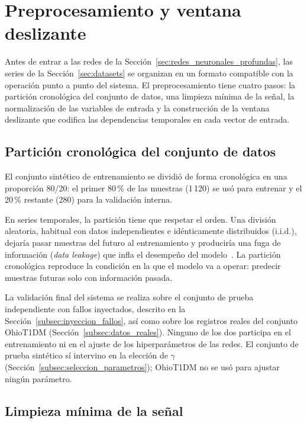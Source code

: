 \documentclass{report}
\begin{document}
\section{Preprocesamiento y ventana deslizante}
\label{sec:preprocesamiento}

Antes de entrar a las redes de la Sección~\ref{sec:redes_neuronales_profundas}, las series de la Sección~\ref{sec:datasets} se organizan en un formato compatible con la operación punto a punto del sistema. El preprocesamiento tiene cuatro pasos: la partición cronológica del conjunto de datos, una limpieza mínima de la señal, la normalización de las variables de entrada y la construcción de la ventana deslizante que codifica las dependencias temporales en cada vector de entrada.

\subsection{Partición cronológica del conjunto de datos}
\label{subsec:particion_datos}

El conjunto sintético de entrenamiento se dividió de forma cronológica en una proporción 80/20: el primer 80\,\% de las muestras (1\,120) se usó para entrenar y el 20\,\% restante (280) para la validación interna.

En series temporales, la partición tiene que respetar el orden. Una división aleatoria, habitual con datos independientes e idénticamente distribuidos (i.i.d.), dejaría pasar muestras del futuro al entrenamiento y produciría una fuga de información (\textit{data leakage}) que infla el desempeño del modelo~\cite{scholz2004metabolite}. La partición cronológica reproduce la condición en la que el modelo va a operar: predecir muestras futuras solo con información pasada.

La validación final del sistema se realiza sobre el conjunto de prueba independiente con fallos inyectados, descrito en la Sección~\ref{subsec:inyeccion_fallos}, así como sobre los registros reales del conjunto OhioT1DM (Sección~\ref{subsec:datos_reales}). Ninguno de los dos participa en el entrenamiento ni en el ajuste de los hiperparámetros de las redes. El conjunto de prueba sintético sí intervino en la elección de $\gamma$ (Sección~\ref{subsec:seleccion_parametros}); OhioT1DM no se usó para ajustar ningún parámetro.

\subsection{Limpieza mínima de la señal}
\label{subsec:limpieza}
\end{document}
